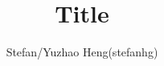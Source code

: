 \documentclass{article}
\title{Title}
\author{Stefan/Yuzhao Heng(stefanhg)}
\begin{document}
\normalsize
\maketitle



\section{}
\end{document}
